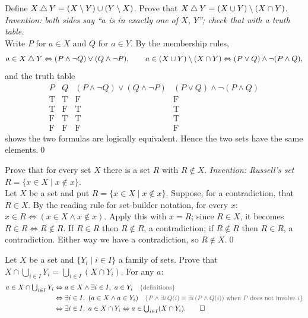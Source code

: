 \begin{bexample}
Define $X\mathbin{\triangle} Y=(X\setminus Y)\cup(Y\setminus X)$. Prove that $X\mathbin{\triangle} Y=(X\cup Y)\setminus(X\cap Y)$.
\solution
\emph{Invention: both sides say ``$a$ is in exactly one of $X$, $Y$''; check that with a truth table.}\\
Write $P$ for $a\in X$ and $Q$ for $a\in Y$. By the membership rules,
\[
a\in X\mathbin{\triangle} Y\Leftrightarrow(P\wedge\neg Q)\vee(Q\wedge\neg P),\qquad a\in(X\cup Y)\setminus(X\cap Y)\Leftrightarrow(P\vee Q)\wedge\neg(P\wedge Q),
\]
and the truth table
\[
\begin{array}{cc|cc}
P&Q&(P\wedge\neg Q)\vee(Q\wedge\neg P)&(P\vee Q)\wedge\neg(P\wedge Q)\\\hline
\mathrm T&\mathrm T&\mathrm F&\mathrm F\\ \mathrm T&\mathrm F&\mathrm T&\mathrm T\\ \mathrm F&\mathrm T&\mathrm T&\mathrm T\\ \mathrm F&\mathrm F&\mathrm F&\mathrm F
\end{array}
\]
shows the two formulas are logically equivalent. Hence the two sets have the same elements.\qed
\end{bexample}

\begin{bexample}
Prove that for every set $X$ there is a set $R$ with $R\notin X$.
\solution
\emph{Invention: Russell's set $R=\{x\in X\mid x\notin x\}$.}\\
Let $X$ be a set and put $R=\{x\in X\mid x\notin x\}$. Suppose, for a contradiction, that $R\in X$. By the reading rule for set-builder notation, for every $x$: $x\in R\Leftrightarrow(x\in X\wedge x\notin x)$. Apply this with $x=R$; since $R\in X$, it becomes $R\in R\Leftrightarrow R\notin R$. If $R\in R$ then $R\notin R$, a contradiction; if $R\notin R$ then $R\in R$, a contradiction. Either way we have a contradiction, so $R\notin X$.\qed
\end{bexample}

\begin{bexample}
Let $X$ be a set and $\{Y_i\mid i\in I\}$ a family of sets. Prove that $X\cap\bigcup_{i\in I}Y_i=\bigcup_{i\in I}(X\cap Y_i)$.
\solution
For any $a$:
\begin{align*}
a\in X\cap\textstyle\bigcup_{i\in I}Y_i&\Leftrightarrow a\in X\wedge\exists i\in I,\ a\in Y_i\reason{definitions}\\
&\Leftrightarrow\exists i\in I,\ (a\in X\wedge a\in Y_i)\reason{$P\wedge\exists i\,Q(i)\equiv\exists i\,(P\wedge Q(i))$ when $P$ does not involve $i$}\\
&\Leftrightarrow\exists i\in I,\ a\in X\cap Y_i\Leftrightarrow a\in\textstyle\bigcup_{i\in I}(X\cap Y_i).\qquad\square
\end{align*}
\end{bexample}

